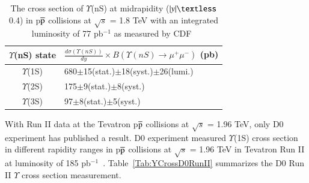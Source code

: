 

\begin{table}
  \begin{center}
    \caption[]{The cross section of $\Upsilon$(nS) at midrapidity
($|y|\textless$ 0.4) in p$\overline{\rm p}$ collisions at $\surd s$ = 1.8 TeV with
an integrated luminosity of 77 pb$^{-1}$ as measured by CDF~\cite{CDF:2001fdy}}
\label{Tab:YCrossCDF02}
\begin{tabular}{cl} 
\hline 
\hline
$\Upsilon$(nS) state             &$\frac{d\sigma(\Upsilon(nS))}{dy}\times B(\Upsilon(nS)\rightarrow\mu^{+}\mu^{-})$ (pb)    \\              
\hline
$\Upsilon$(1S)                   &680$\pm$15(stat.)$\pm$18(syst.)$\pm$26(lumi.)\\
$\Upsilon$(2S)                   &175$\pm$9(stat.)$\pm$8(syst.)\\
$\Upsilon$(3S)                   &97$\pm$8(stat.)$\pm$5(syst.)\\   
\hline
\hline
\end{tabular}
\end{center}
\end{table}

With Run II data at the Tevatron p$\overline{\rm p}$ collisions at $\surd s$ = 1.96 TeV,
only D0 experiment has published a result.
D0 experiment measured $\Upsilon$(1S) cross section in different 
rapidity ranges in p$\overline{\rm p}$ collisions at $\surd s$  = 1.96 TeV in
Tevatron Run II at luminosity of 185 pb$^{-1}$~\cite{D0:2005klj}.
Table~\ref{Tab:YCrossD0RunII} summarizes the D0 Run II $\Upsilon$ cross section
measurement.


